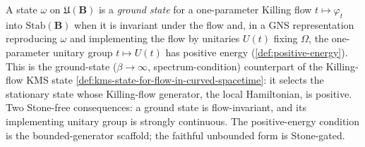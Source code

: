 \begin{definition}
    \label{def:ground-state-for-flow-in-curved-spacetime}
    \leanok
    A state $\omega$ on $\mathfrak{U}(\mathbf{B})$ is a \emph{ground state} for a one-parameter Killing flow $t \mapsto \varphi_t$ into $\mathrm{Stab}(\mathbf{B})$ when it is invariant under the flow and, in a GNS representation reproducing $\omega$ and implementing the flow by unitaries $U(t)$ fixing $\Omega$, the one-parameter unitary group $t \mapsto U(t)$ has positive energy (\ref{def:positive-energy}). This is the ground-state ($\beta \to \infty$, spectrum-condition) counterpart of the Killing-flow KMS state \ref{def:kms-state-for-flow-in-curved-spacetime}: it selects the stationary state whose Killing-flow generator, the local Hamiltonian, is positive. Two Stone-free consequences: a ground state is flow-invariant, and its implementing unitary group is strongly continuous. The positive-energy condition is the bounded-generator scaffold; the faithful unbounded form is Stone-gated.
\end{definition}
